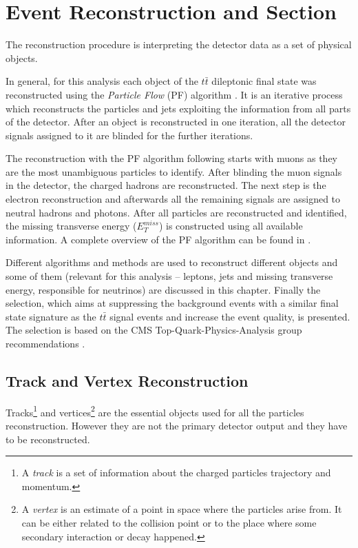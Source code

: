 \chapter{Event Reconstruction and Section}\label{chapt:event_selection}

The reconstruction procedure is interpreting the detector data as a set of physical objects.

In general, for this analysis each object of the $t\bar{t}$ dileptonic final state was reconstructed using the \textit{Particle Flow} (PF)
algorithm \cite{Beaudette:2014cea}. It is an iterative process which reconstructs the particles and jets exploiting the information from all parts
of the detector. After an object is reconstructed in one iteration, all the detector signals assigned to it are blinded for the further iterations.

The reconstruction with the PF algorithm following \cite{Beaudette:2014cea} starts with muons as they are the most unambiguous particles to identify.
After blinding the muon signals in the detector, the charged hadrons are reconstructed. The next step is the electron reconstruction and afterwards
all the remaining signals are assigned to neutral hadrons and photons. After all particles are reconstructed and identified, the missing transverse
energy ($E_{T}^{miss}$) is constructed using all available information. A complete overview of the PF algorithm can be found in \cite{CMS-PAS-PFT-09-001}. 

Different algorithms and methods are used to reconstruct different objects and some of them (relevant for this analysis -- leptons, jets and missing transverse
energy, responsible for neutrinos) are discussed in this chapter. Finally the selection, which aims at suppressing the background events
with a similar final state signature as the $t\bar{t}$ signal events and increase the event quality, is presented. 
The selection is based on the CMS Top-Quark-Physics-Analysis group recommendations \cite{TopPAGreco}.

\section{Track and Vertex Reconstruction}

Tracks\footnote{A \textit{track} is a set of information about the charged particles trajectory and momentum.} and vertices\footnote{A 
\textit{vertex} is an estimate of a point in space where the particles arise from. It can be either related to the 
collision point or to the place  where some secondary interaction or decay happened.} are the essential objects used for all the particles reconstruction. 
However they are not the primary detector output and they have to be reconstructed.

